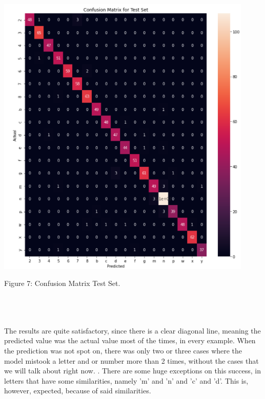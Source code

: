 \documentclass[conference]{IEEEtran}
\begin{document}
\\ \\ \\
\begin{center}
\includegraphics[scale=0.55]{confusionmatrix2.png}
\caption{Figure 7: Confusion Matrix Test Set.}
\end{center}
\\ \\ \\
The results are quite satisfactory, since there is a clear diagonal line, meaning the predicted value was the actual value most of the times, in every example. When the prediction was not spot on, there was only two or three cases where the model mistook a letter and or number more than 2 times, without the cases that we will talk about right now. . There are some huge exceptions on this success, in letters that have some similarities, namely 'm' and 'n' and 'c' and 'd'. This is, however, expected, because of said similarities.
\end{document}
